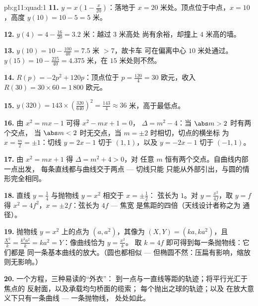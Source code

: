 \begin{solution}{pb:g11:quad:1}
\textbf{11.} $y = x\left(1 - \frac{x}{20}\right)$：落地于
$x = 20$ 米处。顶点位于中点，$x = 10$，高度
$y(10) = 10 - 5 = 5$ 米。

\textbf{12.} $y(4) = 4 - \frac{16}{20} = 3.2$ 米：越过 $3$ 米高处
尚有余裕，却撞上 $4$ 米高的墙。

\textbf{13.} $y(10) = 10 - \frac{100}{40} = 7.5$ 米 $> 7$，故卡车
可在偏离中心 $10$ 米处通过。$y(15) = 10 - \frac{225}{40}
= 4.375$ 米，在 $15$ 米处则不然。

\textbf{14.} $R(p) = -2p^2 + 120p$：顶点位于
$p = \frac{120}{4} = 30$ 欧元，收入
$R(30) = 30 \times 60 = 1\,800$ 欧元。

\textbf{15.} $y(320) = 143 \times \left(\frac{320}{640}\right)^2
= \frac{143}{4} \approx 36$ 米，高于最低点。

\textbf{16.} 由 $x^2 = mx - 1$ 可得 $x^2 - mx + 1 = 0$，
$\Delta = m^2 - 4$：当 $\abs m > 2$ 时有两个交点，
当 $\abs m < 2$ 时无交点，当 $m = \pm 2$ 时相切，切点的横坐标
为 $x = \frac m2 = \pm 1$：切线 $y = 2x - 1$ 切于 $(1, 1)$，以及
$y = -2x - 1$ 切于 $(-1, 1)$。

\textbf{17.} 由 $x^2 = mx + 1$ 得 $\Delta = m^2 + 4 > 0$，对
任意 $m$ 恒有两个交点。自曲线内部一点出发，
每条直线都与曲线交于两点 --- 切线只能
只能从外部引出，与圆的情形完全相同。

\textbf{18.} 直线 $y = \frac14$ 与抛物线 $y = x^2$ 相交于 $x = \pm\frac12$：
弦长为 $1$。对 $y = \frac{x^2}{4f}$，取 $y = f$ 得
$x^2 = 4f^2$，$x = \pm 2f$：弦长为 $4f$ --- 焦宽
是焦距的四倍（天线设计者称之为
通径）。

\textbf{19.} 抛物线 $y = x^2$ 上的点为 $(a, a^2)$，其像为
$(X, Y) = (ka, ka^2)$，且 $\frac{X^2}{k} = \frac{k^2a^2}{k} =
ka^2 = Y$：像曲线恰为 $y = \frac{x^2}{k}$。
取 $k = 4f$ 即可得到每一条抛物线：它们都是
同一条基本曲线的放大。（圆也都相似 ---
但椭圆不然：压扁有影响，缩放则无影响。）

\textbf{20.} 一个方程，三种易读的“外衣”：
到一点与一直线等距的轨迹；将平行光汇于焦点的
反射面，以及承载均匀桥面的缆索；
每个抛出之球的轨迹；以及
在放大意义下只有一条曲线 --- 一条抛物线，
处处如此。
\end{solution}
